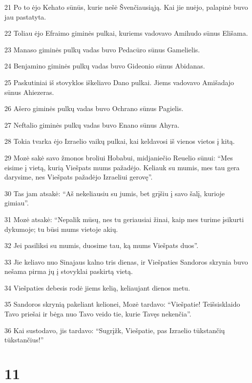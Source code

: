 \par 21 Po to ėjo Kehato sūnūs, kurie nešė Švenčiausiąją. Kai jie nuėjo, palapinė buvo jau pastatyta. 
\par 22 Toliau ėjo Efraimo giminės pulkai, kuriems vadovavo Amihudo sūnus Elišama. 
\par 23 Manaso giminės pulkų vadas buvo Pedacūro sūnus Gamelielis. 
\par 24 Benjamino giminės pulkų vadas buvo Gideonio sūnus Abidanas. 
\par 25 Paskutiniai iš stovyklos iškeliavo Dano pulkai. Jiems vadovavo Amišadajo sūnus Ahiezeras. 
\par 26 Ašero giminės pulkų vadas buvo Ochrano sūnus Pagielis. 
\par 27 Neftalio giminės pulkų vadas buvo Enano sūnus Ahyra. 
\par 28 Tokia tvarka ėjo Izraelio vaikų pulkai, kai keldavosi iš vienos vietos į kitą. 
\par 29 Mozė sakė savo žmonos broliui Hobabui, midjaniečio Reuelio sūnui: “Mes eisime į vietą, kurią Viešpats mums pažadėjo. Keliauk su mumis, mes tau gera darysime, nes Viešpats pažadėjo Izraeliui gerovę”. 
\par 30 Tas jam atsakė: “Aš nekeliausiu su jumis, bet grįšiu į savo šalį, kurioje gimiau”. 
\par 31 Mozė atsakė: “Nepalik mūsų, nes tu geriausiai žinai, kaip mes turime įsikurti dykumoje; tu būsi mums vietoje akių. 
\par 32 Jei pasiliksi su mumis, duosime tau, ką mums Viešpats duos”. 
\par 33 Jie keliavo nuo Sinajaus kalno tris dienas, ir Viešpaties Sandoros skrynia buvo nešama pirma jų į stovyklai paskirtą vietą. 
\par 34 Viešpaties debesis rodė jiems kelią, keliaujant dienos metu. 
\par 35 Sandoros skrynią pakeliant kelionei, Mozė tardavo: “Viešpatie! Teišsisklaido Tavo priešai ir bėga nuo Tavo veido tie, kurie Tavęs nekenčia”. 
\par 36 Kai sustodavo, jis tardavo: “Sugrįžk, Viešpatie, pas Izraelio tūkstančių tūkstančius!”



\chapter{11}



